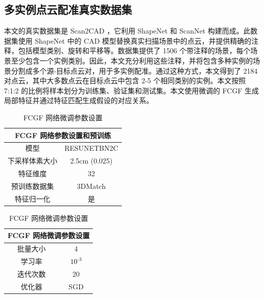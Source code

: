 \subsection{多实例点云配准真实数据集}
本文的真实数据集是 Scan2CAD ，它利用 ShapeNet 和 ScanNet 构建而成。此数据集使用 ShapeNet 中的 CAD 模型替换真实扫描场景中的点云，并提供精确的注释，包括模型类别、旋转和平移等。数据集提供了 1506 个带注释的场景，每个场景至少包含一个实例类别。因此，本文充分利用这些注释，并将包含多种实例的场景分割成多个源-目标点云对，用于多实例配准。通过这种方式，本文得到了 2184 对点云，其中大多数点云在目标点云中包含 2-5 个相同类别的实例。本文按照 7:1:2 的比例将样本划分为训练集、验证集和测试集。本文使用微调的 FCGF\cite{FCGF2019} 生成局部特征并通过特征匹配生成假设的对应关系。
\begin{table}[h]
    \centering
    \vspace{-1.0cm}
    \begin{minipage}{0.45\textwidth}
        \centering
        \caption{FCGF 网络参数设置和预训练}
        \label{tab:fcgf}
        \begin{tabular}{cc}
        \toprule
        \multicolumn{2}{c}{FCGF 网络参数设置和预训练} \\ 
        \midrule
        模型                 & RESUNETBN2C      \\ 
        下采样体素大小          & 2.5cm (0.025)    \\ 
        特征维度                & 32               \\ 
        预训练数据集             & 3DMatch          \\ 
        特征归一化              & 是               \\ 
        \bottomrule
        \end{tabular}
    \end{minipage}
    \hfill
    \begin{minipage}{0.45\textwidth}
        \centering
        \caption{FCGF 网络微调参数设置}
        \label{tab:fcgf_finetune}
        \begin{tabular}{cc}
        \toprule
        \multicolumn{2}{c}{FCGF 网络微调参数设置} \\ 
        \midrule
        批量大小               & 4                 \\ 
        学习率                 & $\text{10}^{\text{-3}}$         \\ 
        迭代次数                & 20                \\ 
        优化器                 & SGD               \\ 
        \bottomrule
        \end{tabular}
    \end{minipage}
    \vspace{-1.0cm}
\end{table}

